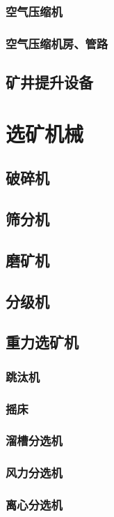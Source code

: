 \documentclass[UTF8]{../../ApplicationUniverse}
\begin{document}
        \subsubsection{空气压缩机}
        \subsubsection{空气压缩机房、管路}
    \subsection{矿井提升设备}
\section{选矿机械}
    \subsection{破碎机}
    \subsection{筛分机}
    \subsection{磨矿机}
    \subsection{分级机}
    \subsection{重力选矿机}
        \subsubsection{跳汰机}
        \subsubsection{摇床}
        \subsubsection{溜槽分选机}
        \subsubsection{风力分选机}
        \subsubsection{离心分选机}
\end{document}
